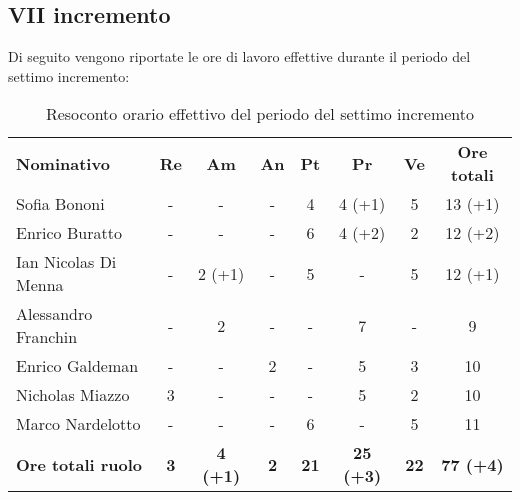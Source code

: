 \documentclass[../piano-di-progetto.tex]{subfiles}
\begin{document}
\subsection{VII incremento}

Di seguito vengono riportate le ore di lavoro effettive durante il periodo del settimo incremento:
\begin{table}[H]
    \centering
    \begin{tabular}{lccccccc}
      \rowcolor{lightgray}
      \textbf{Nominativo}       & \textbf{Re}      & \textbf{Am} & \textbf{An}      & \textbf{Pt} & \textbf{Pr} & \textbf{Ve} & \textbf{Ore totali} \\
Sofia Bononi              & -          & -               & -          & 4           & 4 (+1)           & 5           & 13 (+1)          \\
Enrico Buratto            & -          & -               & -          & 6           & 4 (+2)           & 2           & 12 (+2)          \\
Ian Nicolas Di Menna      & -          & 2 (+1)          & -          & 5           & -                & 5           & 12 (+1)          \\
Alessandro Franchin       & -          & 2               & -          & -           & 7                & -           & 9                \\
Enrico Galdeman           & -          & -               & 2          & -           & 5                & 3           & 10               \\
Nicholas Miazzo           & 3          & -               & -          & -           & 5                & 2           & 10               \\
Marco Nardelotto          & -          & -               & -          & 6           & -                & 5           & 11               \\
\textbf{Ore totali ruolo} & \textbf{3} & \textbf{4 (+1)} & \textbf{2} & \textbf{21} & \textbf{25 (+3)} & \textbf{22} & \textbf{77 (+4)}

    \end{tabular}
    \caption{Resoconto orario effettivo del periodo del settimo incremento}
  \end{table}
\end{document}

